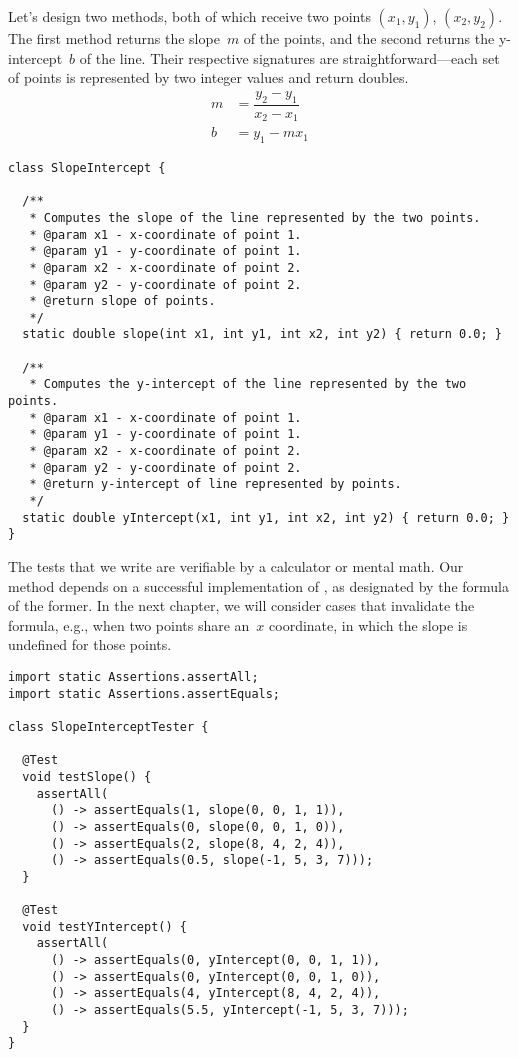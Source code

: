Let's design two methods, both of which receive two points $(x_1, y_1)$, $(x_2, y_2)$. 
The first method returns the slope~$m$ of the points, and the second returns the y-intercept~$b$ of the line. 
Their respective signatures are straightforward---each set of points is represented by two integer values and return doubles.
\begin{align*}
m &= \dfrac{y_2-y_1}{x_2-x_1}\\
b &= y_1 - mx_1
\end{align*}
\enlargethispage{3\baselineskip}
\begin{lstlisting}[language=MyJava]
class SlopeIntercept {

  /**
   * Computes the slope of the line represented by the two points.
   * @param x1 - x-coordinate of point 1.
   * @param y1 - y-coordinate of point 1.
   * @param x2 - x-coordinate of point 2.
   * @param y2 - y-coordinate of point 2.
   * @return slope of points.
   */
  static double slope(int x1, int y1, int x2, int y2) { return 0.0; }

  /**
   * Computes the y-intercept of the line represented by the two points.
   * @param x1 - x-coordinate of point 1.
   * @param y1 - y-coordinate of point 1.
   * @param x2 - x-coordinate of point 2.
   * @param y2 - y-coordinate of point 2.
   * @return y-intercept of line represented by points.
   */
  static double yIntercept(x1, int y1, int x2, int y2) { return 0.0; }
}
\end{lstlisting}

The tests that we write are verifiable by a calculator or mental math. 
Our  method depends on a successful implementation of , as designated by the formula of the former. 
In the next chapter, we will consider cases that invalidate the formula, e.g., when two points share an~$x$ coordinate, in which the slope is undefined for those points.

\begin{lstlisting}[language=MyJava]
import static Assertions.assertAll;
import static Assertions.assertEquals;

class SlopeInterceptTester {
  
  @Test
  void testSlope() {
    assertAll(
      () -> assertEquals(1, slope(0, 0, 1, 1)),
      () -> assertEquals(0, slope(0, 0, 1, 0)),
      () -> assertEquals(2, slope(8, 4, 2, 4)),
      () -> assertEquals(0.5, slope(-1, 5, 3, 7)));
  }

  @Test
  void testYIntercept() {
    assertAll(
      () -> assertEquals(0, yIntercept(0, 0, 1, 1)),
      () -> assertEquals(0, yIntercept(0, 0, 1, 0)),
      () -> assertEquals(4, yIntercept(8, 4, 2, 4)),
      () -> assertEquals(5.5, yIntercept(-1, 5, 3, 7)));
  }
}
\end{lstlisting}

